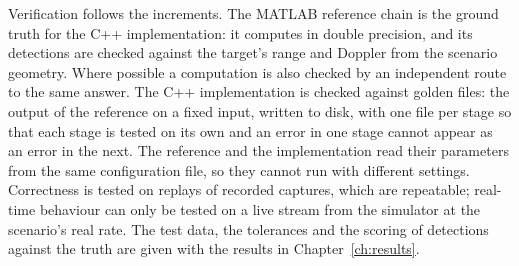 Verification follows the increments. The MATLAB reference chain is the ground truth for the C++ implementation: it computes in double precision, and its detections are checked against the target's range and Doppler from the scenario geometry. Where possible a computation is also checked by an independent route to the same answer. The C++ implementation is checked against golden files: the output of the reference on a fixed input, written to disk, with one file per stage so that each stage is tested on its own and an error in one stage cannot appear as an error in the next. The reference and the implementation read their parameters from the same configuration file, so they cannot run with different settings. Correctness is tested on replays of recorded captures, which are repeatable; real-time behaviour can only be tested on a live stream from the simulator at the scenario's real rate. The test data, the tolerances and the scoring of detections against the truth are given with the results in Chapter~\ref{ch:results}.


